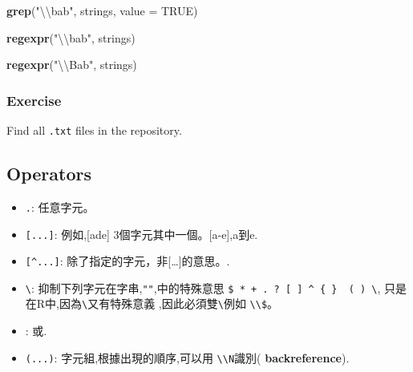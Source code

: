 \documentclass[]{book}
\newenvironment{Shaded}{\begin{snugshade}}{\end{snugshade}}
\newcommand{\KeywordTok}[1]{\textcolor[rgb]{0.13,0.29,0.53}{\textbf{#1}}}
\newcommand{\DataTypeTok}[1]{\textcolor[rgb]{0.13,0.29,0.53}{#1}}
\newcommand{\CharTok}[1]{\textcolor[rgb]{0.31,0.60,0.02}{#1}}
\newcommand{\StringTok}[1]{\textcolor[rgb]{0.31,0.60,0.02}{#1}}
\newcommand{\OtherTok}[1]{\textcolor[rgb]{0.56,0.35,0.01}{#1}}
\newcommand{\NormalTok}[1]{#1}
\providecommand{\tightlist}{%
  \setlength{\itemsep}{0pt}\setlength{\parskip}{0pt}}
\theoremstyle{definition}
\theoremstyle{definition}
\theoremstyle{definition}
\theoremstyle{remark}
\begin{document}
\begin{Shaded}
\begin{Highlighting}[]
\KeywordTok{grep}\NormalTok{(}\StringTok{"}\CharTok{\textbackslash{}\textbackslash{}}\StringTok{bab"}\NormalTok{, strings, }\DataTypeTok{value =} \OtherTok{TRUE}\NormalTok{)}
\end{Highlighting}
\end{Shaded}

\begin{Shaded}
\begin{Highlighting}[]
\KeywordTok{regexpr}\NormalTok{(}\StringTok{"}\CharTok{\textbackslash{}\textbackslash{}}\StringTok{bab"}\NormalTok{, strings)}
\end{Highlighting}
\end{Shaded}

\begin{Shaded}
\begin{Highlighting}[]
\KeywordTok{regexpr}\NormalTok{(}\StringTok{"}\CharTok{\textbackslash{}\textbackslash{}}\StringTok{Bab"}\NormalTok{, strings)}
\end{Highlighting}
\end{Shaded}

\subsubsection{Exercise}\label{exercise-1}

Find all \texttt{.txt} files in the repository.

\subsection{Operators}\label{operators}

\begin{itemize}
\tightlist
\item
  \texttt{.}: 任意字元。\\
\item
  \texttt{{[}...{]}}: 例如,{[}ade{]} 3個字元其中一個。{[}a-e{]},a到e.\\
\item
  \texttt{{[}\^{}...{]}}:
  除了\protect\hyperlink{section-1}{}指定的字元，非{[}\ldots{}{]}的意思。.\\
\item
  \texttt{\textbackslash{}}: 抑制下列字元在字串,\texttt{""},中的特殊意思
  \texttt{\$\ *\ +\ .\ ?\ {[}\ {]}\ \^{}\ \{\ \}\ \textbar{}\ (\ )\ \textbackslash{}},
  只是在R中,因為\texttt{\textbackslash{}}又有特殊意義
  ,因此必須雙\texttt{\textbackslash{}}例如
  \texttt{\textbackslash{}\textbackslash{}\$}。\\
\item
  \texttt{\textbar{}}: 或.\\
\item
  \texttt{(...)}: 字元組,根據出現的順序,可以用
  \texttt{\textbackslash{}\textbackslash{}N}識別(
  \textbf{backreference}).
\end{itemize}
\end{document}
